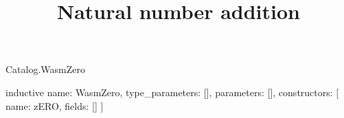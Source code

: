 \begin{lexlean}{Catalog.WasmZero}
\title{Natural number addition}
\begin{semanticmodule}
inductive{
  name: WasmZero,
  type_parameters: [],
  parameters: [],
  constructors: [
    {name: zERO, fields: []}
  ]
}
\end{semanticmodule}
\end{lexlean}
